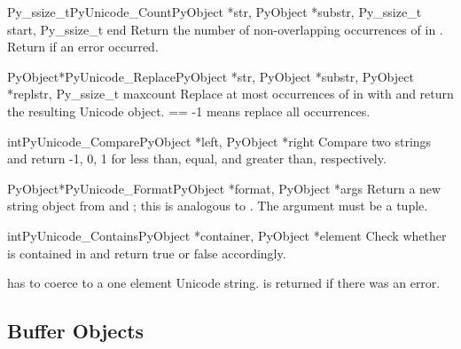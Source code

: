 \begin{cfuncdesc}{Py_ssize_t}{PyUnicode_Count}{PyObject *str,
                                        PyObject *substr,
                                        Py_ssize_t start,
                                        Py_ssize_t end}
  Return the number of non-overlapping occurrences of  in
  .  Return  if an
  error occurred.
\end{cfuncdesc}

\begin{cfuncdesc}{PyObject*}{PyUnicode_Replace}{PyObject *str,
                                                PyObject *substr,
                                                PyObject *replstr,
                                                Py_ssize_t maxcount}
  Replace at most  occurrences of  in
   with  and return the resulting Unicode object.
   == -1 means replace all occurrences.
\end{cfuncdesc}

\begin{cfuncdesc}{int}{PyUnicode_Compare}{PyObject *left, PyObject *right}
  Compare two strings and return -1, 0, 1 for less than, equal, and
  greater than, respectively.
\end{cfuncdesc}

\begin{cfuncdesc}{PyObject*}{PyUnicode_Format}{PyObject *format,
                                              PyObject *args}
  Return a new string object from  and ; this
  is analogous to .  The
   argument must be a tuple.
\end{cfuncdesc}

\begin{cfuncdesc}{int}{PyUnicode_Contains}{PyObject *container,
                                           PyObject *element}
  Check whether  is contained in  and
  return true or false accordingly.

   has to coerce to a one element Unicode
  string.  is returned if there was an error.
\end{cfuncdesc}


\subsection{Buffer Objects \label{bufferObjects}}

